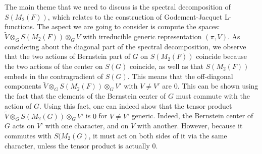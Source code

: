 \documentclass[12pt,a4paper,english]{article}
\theoremstyle{plain}
\theoremstyle{definition}
\begin{document}
The main theme that we need to discuss is the spectral decomposition of $S(M_{2}(F))$, which relates to the construction of Godement-Jacquet L-functions. The aspect we are going to consider is compute the spaces: $\tilde{V}\otimes_{G}S(M_{2}(F))\otimes_{G}V$ with irreducible generic representation $(\pi, V)$. As considering about the diagonal part of the spectral decomposition, we observe that the two actions of Bernstein part of $G$ on $S(M_{2}(F))$ coincide because the two actions of the center on $S(G)$ coincide, as well as that $S(M_{2}(F))$ embeds in the contragradient of $S(G)$. This means that the off-diagonal components $\tilde{V}\otimes_{G}S(M_{2}(F))\otimes_{G}V'$ with $V\not=V'$ are 0. 
This can be shown using the fact that the elements of the Bernstein center of $G$ must commute with the action of $G$. Using this fact, one can indeed show that the tensor product $\widetilde{V} \otimes_G S(M_2(G)) \otimes_G V’$ is $0$ for $V\neq V’$ generic. Indeed, the Bernstein center of $G$ acts on $V’$ with one character, and on $V$ with another. However, because it commutes with $S(M_2(G)$, it must act on both sides of it via the same character, unless the tensor product is actually $0$.
\end{document}
